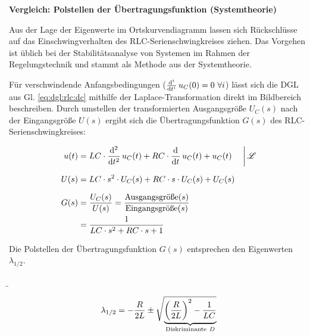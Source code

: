 \begin{frame}[t]
{    \textbf{Vergleich: Polstellen der Übertragungsfunktion (Systemtheorie)}

    Aus der Lage der Eigenwerte im Ortskurvendiagramm lassen sich Rückschlüsse auf das Einschwingverhalten des RLC-Serienschwingkreises ziehen.
    Das Vorgehen ist üblich bei der Stabilitätsanalyse von Systemen im Rahmen der Regelungstechnik und stammt als Methode aus der Systemtheorie.

    Für verschwindende Anfangsbedingungen ($\dt[i]\,u_C(0)=0\ \forall i$) lässt sich die DGL aus Gl. \ref{eq:dgl:rlc:dc}
    mithilfe der Laplace-Transformation direkt im Bildbereich beschreiben. Durch umstellen der transformierten Ausgangsgröße $U_C(s)$
    nach der Eingangsgröße $U(s)$ ergibt sich die Übertragungsfunktion $G(s)$ des RLC-Serienschwingkreises:

    \begin{align}
        u(t) &= LC \cdot \dt[2]\,u_{C}(t) + RC \cdot \dt\,u_{C}(t) + u_{C}(t)& &\bigg|\,\mathscr{L}\\
        U(s) &= LC \cdot s^2 \cdot U_C(s) + RC \cdot s \cdot U_C(s) + U_C(s) \vphantom{\bigg|}\\
        G(s) &= \frac{U_C(s)}{U(s)} = \frac{\text{Ausgangsgröße}(s)}{\text{Eingangsgröße}(s)} \vphantom{\bigg|}\\
        &= \frac{1}{LC \cdot s^2 + RC \cdot s + 1}
    \end{align}

    Die Polstellen der Übertragungsfunktion $G(s)$ entsprechen den Eigenwerten $\lambda_{1/2}$.

}%
\b{%
\begin{minipage}{\textwidth}\centering
    \begin{minipage}[t][3cm][]{0.48\textwidth}\centering
    \end{minipage}%
    \begin{minipage}[t][3cm][]{0.48\textwidth}\centering
    \begin{align*}
        \lambda_{1/2} = -\frac{R}{2L} \pm \sqrt{
            \smash{\underbrace{%
            \left(\frac{R}{2L}\right)^2 - \frac{1}{LC}
            }_{\mathclap{\text{Diskriminante}\ D}}}
            \vphantom{\left(\frac{R}{2L}\right)^2 - \frac{1}{LC}}%
        }%
    \end{align*}
    \end{minipage}
\end{minipage}\vspace{2pt}

}
\end{frame}
